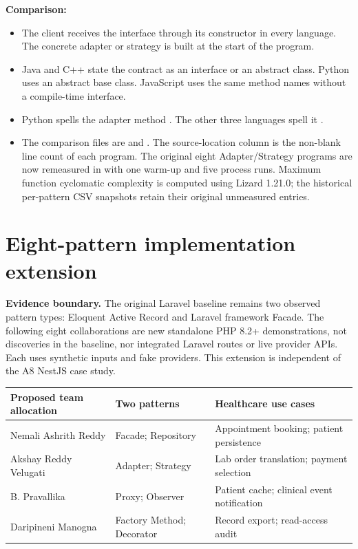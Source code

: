 \documentclass[11pt,a4paper]{article}
\newcommand{\field}[1]{\textbf{#1:}\ }
\newcommand{\code}[1]{\texttt{\detokenize{#1}}}
\begin{document}
\field{Comparison}
\begin{itemize}
\item The client receives the interface through its constructor in every language. The concrete adapter or strategy is built at the start of the program.
\item Java and C++ state the contract as an interface or an abstract class. Python uses an abstract base class. JavaScript uses the same method names without a compile-time interface.
\item Python spells the adapter method \code{get\_patient\_record}. The other three languages spell it \code{getPatientRecord}.
\item The comparison files are  and . The source-location column is the non-blank line count of each program. The original eight Adapter/Strategy programs are now remeasured in  with one warm-up and five process runs. Maximum function cyclomatic complexity is computed using Lizard 1.21.0; the historical per-pattern CSV snapshots retain their original unmeasured entries.
\end{itemize}

\section{Eight-pattern implementation extension}
\textbf{Evidence boundary.} The original Laravel baseline remains two observed pattern types: Eloquent Active Record and Laravel framework Facade. The following eight collaborations are new standalone PHP 8.2+ demonstrations, not discoveries in the baseline, nor integrated Laravel routes or live provider APIs. Each uses synthetic inputs and fake providers. This extension is independent of the A8 NestJS case study.

\begin{center}\small
\begin{tabularx}{\linewidth}{@{}P{36mm}P{39mm}L@{}}\toprule
Proposed team allocation & Two patterns & Healthcare use cases\\\midrule
Nemali Ashrith Reddy & Facade; Repository & Appointment booking; patient persistence\\
Akshay Reddy Velugati & Adapter; Strategy & Lab order translation; payment selection\\
B. Pravallika & Proxy; Observer & Patient cache; clinical event notification\\
Daripineni Manogna & Factory Method; Decorator & Record export; read-access audit\\\bottomrule
\end{tabularx}
\end{center}
\end{document}
